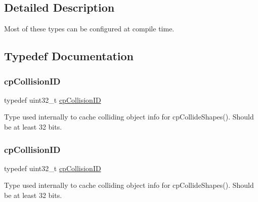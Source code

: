 \subsection{Detailed Description}
Most of these types can be configured at compile time. 

\subsection{Typedef Documentation}
\mbox{\label{group__basicTypes_ga89d4043ca0567e947aaca19cf9600df5}} 
\subsubsection{\texorpdfstring{cp\+Collision\+ID}{cpCollisionID}\hspace{0.1cm}{\footnotesize\ttfamily [1/2]}}
{\footnotesize\ttfamily typedef uint32\+\_\+t \hyperlink{group__basicTypes_ga89d4043ca0567e947aaca19cf9600df5}{cp\+Collision\+ID}}

Type used internally to cache colliding object info for cp\+Collide\+Shapes(). Should be at least 32 bits. \mbox{\label{group__basicTypes_ga89d4043ca0567e947aaca19cf9600df5}} 
\subsubsection{\texorpdfstring{cp\+Collision\+ID}{cpCollisionID}\hspace{0.1cm}{\footnotesize\ttfamily [2/2]}}
{\footnotesize\ttfamily typedef uint32\+\_\+t \hyperlink{group__basicTypes_ga89d4043ca0567e947aaca19cf9600df5}{cp\+Collision\+ID}}

Type used internally to cache colliding object info for cp\+Collide\+Shapes(). Should be at least 32 bits. 